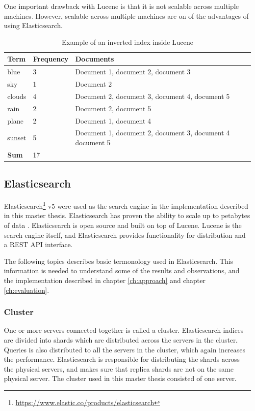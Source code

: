 One important drawback with Lucene is that it is not scalable across multiple machines.
However, scalable across multiple machines are on of the advantages of using Elasticsearch.

\begin{table}[h]
    \centering
    \begin{tabular}{l|l|l}
    Term   & Frequency & Documents                                                 \\ \hline
    blue   & 3         & Document 1, document 2, document 3                        \\
    sky    & 1         & Document 2                                                \\
    clouds & 4         & Document 2, document 3, document 4, document 5            \\
    rain   & 2         & Document 2, document 5                                    \\
    plane  & 2         & Document 1, document 4                                    \\
    sunset & 5         & Document 1, document 2, document 3, document 4 document 5 \\ \hline
    \textbf{Sum} & 17  &                                                           \\
    \end{tabular}
    \caption{Example of an inverted index inside Lucene}
    \label{tbl:inverted-index}
\end{table}


\subsection{Elasticsearch}
Elasticsearch\footnote{\url{https://www.elastic.co/products/elasticsearch}} v5 were used as the search engine in the implementation described in this master thesis.
Elasticsearch has proven the ability to scale up to petabytes of data \cite{elasticsearch-scale}.
Elasticsearch is open source and built on top of Lucene.
Lucene is the search engine itself,
and Elasticsearch provides functionality for distribution and a REST API interface.

The following topics describes basic termonology used in Elasticsearch.
This information is needed to understand some of the results and observations,
and the implementation described in chapter \ref{ch:approach} and chapter \ref{ch:evaluation}.

\subsubsection{Cluster}
One or more servers connected together is called a cluster.
Elasticsearch indices are divided into shards which are distributed across the servers in the cluster.
Queries is also distributed to all the servers in the cluster, which again increases the performance.
Elasticsearch is responsible for distributing the shards across the physical servers,
and makes sure that replica shards are not on the same physical server.
The cluster used in this master thesis consisted of one server.

